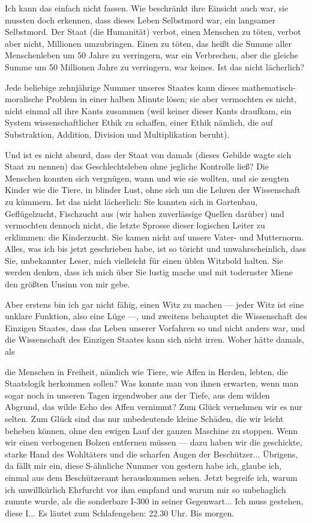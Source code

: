 Ich kann das einfach nicht fassen. Wie beschränkt ihre Einsicht
auch war, sie mussten doch erkennen, dass dieses Leben Selbstmord
war, ein langsamer Selbstmord. Der Staat (die Humanität) verbot,
einen Menschen zu töten, verbot aber nicht, Millionen umzubringen.
Einen zu töten, das heißt die Summe aller Menschenleben um 50 Jahre
zu verringern, war ein Verbrechen, aber die gleiche Summe um 50
Millionen Jahre zu verringern, war keines. Ist das nicht
lächerlich?

Jede beliebige zehnjährige Nummer unseres Staates kann dieses
mathematisch-moralische Problem in einer halben Minute lösen; sie
aber vermochten es nicht, nicht einmal all ihre Kants zusammen
(weil keiner dieser Kants draufkam, ein System wissenschaftlicher
Ethik zu schaffen, einer Ethik nämlich, die auf Substraktion,
Addition, Division und Multiplikation beruht).

Und ist es nicht absurd, dass der Staat von damals (dieses Gebilde
wagte sich Staat zu nennen) das Geschlechtsleben ohne jegliche
Kontrolle ließ? Die Menschen konnten sich vergnügen, wann und wie
sie wollten, und sie zeugten Kinder wie die Tiere, in blinder Lust,
ohne sich um die Lehren der Wissenschaft zu kümmern. Ist das nicht
lächerlich: Sie kannten sich in Gartenbau, Geflügelzucht,
Fischzucht aus (wir haben zuverlässige Quellen darüber) und
vermochten dennoch nicht, die letzte Sprosse dieser logischen
Leiter zu erklimmen: die Kinderzucht. Sie kamen nicht auf unsere
Vater- und Mutternorm. Alles, was ich bis jetzt geschrieben habe,
ist so töricht und unwahrscheinlich, dass Sie, unbekannter Leser,
mich vielleicht für einen üblen Witzbold halten. Sie werden denken,
dass ich mich über Sie lustig mache und mit todernster Miene den
größten Unsinn von mir gebe.

Aber erstens bin ich gar nicht fähig, einen Witz zu machen — jeder
Witz ist eine unklare Funktion, also eine Lüge —, und zweitens
behauptet die Wissenschaft des Einzigen Staates, dass das Leben
unserer Vorfahren so und nicht anders war, und die Wissenschaft des
Einzigen Staates kann sich nicht irren. Woher hätte damals, als

die Menschen in Freiheit, nämlich wie Tiere, wie Affen in Herden,
lebten, die Staatslogik herkommen sollen? Was konnte man von ihnen
erwarten, wenn man sogar noch in unseren Tagen irgendwoher aus der
Tiefe, aus dem wilden Abgrund, das wilde Echo des Affen vernimmt?
Zum Glück vernehmen wir es nur selten. Zum Glück sind das nur
unbedeutende kleine Schäden, die wir leicht beheben können, ohne
den ewigen Lauf der ganzen Maschine zu stoppen. Wenn wir einen
verbogenen Bolzen entfernen müssen — dazu haben wir die geschickte,
starke Hand des Wohltäters und die scharfen Augen der Beschützer...
Übrigens, da fällt mir ein, diese S-ähnliche Nummer von gestern
habe ich, glaube ich, einmal aus dem Beschützeramt herauskommen
sehen. Jetzt begreife ich, warum ich unwillkürlich Ehrfurcht vor
ihm empfand und warum mir so unbehaglich zumute wurde, als die
sonderbare I-300 in seiner Gegenwart... Ich muss gestehen, diese
I... Es läutet zum Schlafengehen: 22.30 Uhr. Bis morgen.

